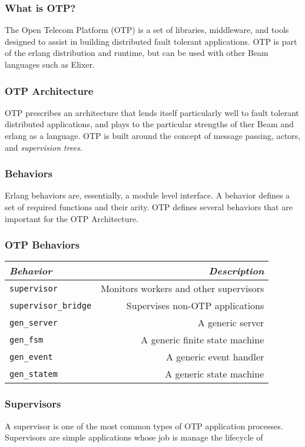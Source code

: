 \documentclass{beamer}
\begin{document}
\begin{frame}
  \frametitle{What is OTP?}
  The Open Telecom Platform (OTP) is a set of libraries, middleware,
  and tools designed to assist in building distributed fault tolerant
  applications.  OTP is part of the erlang distribution and runtime,
  but can be used with other Beam languages such as Elixer.
\end{frame}

\begin{frame}
  \frametitle{OTP Architecture}
  OTP prescribes an architecture that lends itself particularly well
  to fault tolerant distributed applications, and plays to the
  particular strengths of ther Beam and erlang as a language.  OTP is
  built around the concept of message passing, actors, and
  \emph{supervision trees}.
\end{frame}

\begin{frame}
  \frametitle{Behaviors}
  Erlang behaviors are, essentially, a module level interface.  A
  behavior defines a set of required functions and their arity.  OTP
  defines several behaviors that are important for the OTP
  Architecture.
\end{frame}

\begin{frame}
  \frametitle{OTP Behaviors}
  \begin{tabular}{|l|r|}
    \hline
    \emph{Behavior} & \emph{Description} \\
    \hline
    {\tt supervisor} & Monitors workers and other supervisors \\
    \hline
    {\tt supervisor\_bridge} & Supervises non-OTP applications \\
    \hline
    {\tt gen\_server} & A generic server \\
    \hline
    {\tt gen\_fsm} & A generic finite state machine \\
    \hline
    {\tt gen\_event} & A generic event handler \\
    \hline
    {\tt gen\_statem} & A generic state machine \\
    \hline
  \end{tabular}
\end{frame}

\begin{frame}
  \frametitle{Supervisors}
  A supervisor is one of the most common types of OTP application
  processes.  Supervisors are simple applications whose job is manage
  the lifecycle of
\end{frame}
\end{document}
